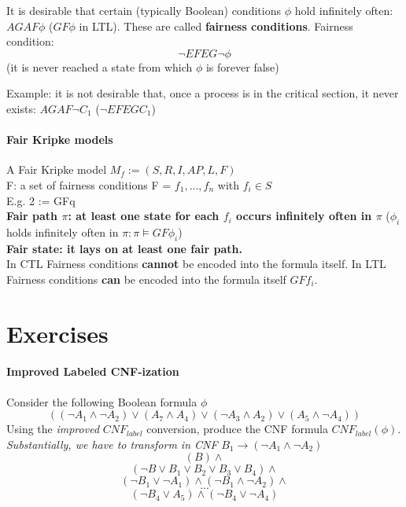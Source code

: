\documentclass[11pt]{article}
\begin{document}
It is desirable that certain (typically Boolean) conditions $\phi$ hold infinitely often: $AGAF\phi$ ($GF\phi$ in LTL). These are called \textbf{fairness conditions}.
Fairness condition:
\[
	\lnot EFEG \lnot \phi
\](it is never reached a state from which $\phi$ is forever false)

Example: it is not desirable that, once a process is in the critical section, it never exists: $AGAF \lnot C_1$ ($\lnot EFEGC_1$)

\paragraph{Fair Kripke models} %
\label{par:fair_kripke_models}
A Fair Kripke model $M_f := (S,R,I,AP,L,F)$\\
F: a set of fairness conditions F = {$f_1, ..., f_n$} with $f_i \in S$\\
E.g. {{2}} := {GFq}\\
\textbf{Fair path $\pi$: at least one state for each $f_i$ occurs infinitely often in $\pi$} ($\phi_i$ holds infinitely often in $\pi : \pi \models GF \phi_i$) \\
\textbf{Fair state: it lays on at least one fair path.}\\
In CTL Fairness conditions \textbf{cannot} be encoded into the formula itself.
In LTL Fairness conditions \textbf{can} be encoded into the formula itself $GFf_i$.




\newpage
\section{Exercises} %
\label{sec:exercises}
\paragraph{Improved Labeled CNF-ization} %
\label{par:labeled_cnf_ization}
Consider the following Boolean formula $\phi$
\[
	((\lnot A_1 \land \lnot A_2) \lor (A_7 \land A_4) \lor (\lnot A_3 \land A_2) \lor (A_5 \land \lnot A_4))
\]
Using the \textit{improved} $CNF_{label}$ conversion, produce the CNF formula $CNF_{label}(\phi)$. \textit{Substantially, we have to transform in CNF} $B_1 \rightarrow (\lnot A_1 \land \lnot A_2)$
\[
	(B) \land
\]\[
 	(\lnot B \lor B_1 \lor B_2 \lor B_3 \lor B_4) \land
\]\[
	(\lnot B_1 \lor \lnot A_1) \land (\lnot B_1 \land \lnot A_2) \land
\]\[
	...
\]\[
	(\lnot B_4 \lor A_5) \land (\lnot B_4 \lor \lnot A_4)
\]
\end{document}
